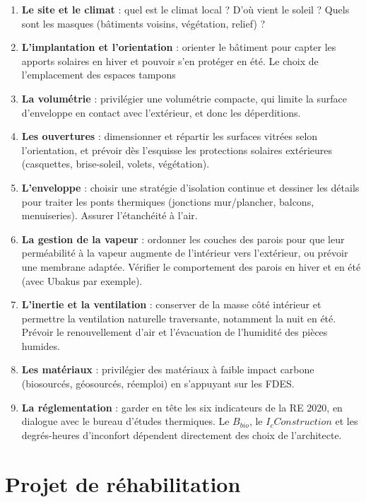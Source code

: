 \begin{enumerate}
    \item \textbf{Le site et le climat} : quel est le climat local ? D'où vient le soleil ? Quels sont les masques (bâtiments voisins, végétation, relief) ?
    \item \textbf{L'implantation et l'orientation} : orienter le bâtiment pour capter les apports solaires en hiver et pouvoir s'en protéger en été. Le choix de l'emplacement des espaces tampons
    \item \textbf{La volumétrie} : privilégier une volumétrie compacte, qui limite la surface d'enveloppe en contact avec l'extérieur, et donc les déperditions.
    \item \textbf{Les ouvertures} : dimensionner et répartir les surfaces vitrées selon l'orientation, et prévoir dès l'esquisse les protections solaires extérieures (casquettes, brise-soleil, volets, végétation).
    \item \textbf{L'enveloppe} : choisir une stratégie d'isolation continue et dessiner les détails pour traiter les ponts thermiques (jonctions mur/plancher, balcons, menuiseries). Assurer l'étanchéité à l'air.
    \item \textbf{La gestion de la vapeur} : ordonner les couches des parois pour que leur perméabilité à la vapeur augmente de l'intérieur vers l'extérieur, ou prévoir une membrane adaptée. Vérifier le comportement des parois en hiver et en été (avec Ubakus par exemple).
    \item \textbf{L'inertie et la ventilation} : conserver de la masse côté intérieur et permettre la ventilation naturelle traversante, notamment la nuit en été. Prévoir le renouvellement d'air et l'évacuation de l'humidité des pièces humides.
    \item \textbf{Les matériaux} : privilégier des matériaux à faible impact carbone (biosourcés, géosourcés, réemploi) en s'appuyant sur les FDES.
    \item \textbf{La réglementation} : garder en tête les six indicateurs de la RE 2020, en dialogue avec le bureau d'études thermiques. Le $B_{bio}$, le $I_c Construction$ et les degrés-heures d'inconfort dépendent directement des choix  de l'architecte.
\end{enumerate}

\section{Projet de réhabilitation}

